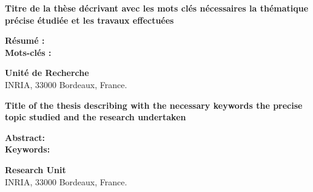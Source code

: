 \vfill
\begin{small}
\begin{center}
\textbf{Titre de la thèse décrivant avec les mots clés nécessaires la thématique précise étudiée et les travaux effectuées}
\end{center}    
\textbf{Résumé :} 
\\

\textbf{Mots-clés :}\\
\noindent\makebox[\linewidth]{\rule{\textwidth}{0.4pt}}

\vfill
\begin{center}
    \textbf{Unité de Recherche}\\
    INRIA, 33000 Bordeaux, France.
\end{center}
\vfill

\clearpage


\begin{center}
\textbf{Title of the thesis describing with the necessary keywords the precise topic studied and the research undertaken}
\end{center}
\textbf{Abstract:} 
\\

\textbf{Keywords:}  \\
\noindent\makebox[\linewidth]{\rule{\textwidth}{0.4pt}}

\vfill
\begin{center}
    \textbf{Research Unit}\\
    INRIA, 33000 Bordeaux, France.
\end{center}
\end{small}
\vfill

